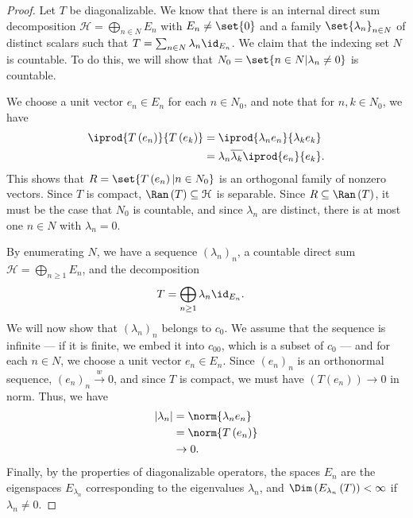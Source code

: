 \documentclass[10pt]{mypackage}
\begin{document}
\begin{proof}
  Let $T$ be diagonalizable. We know that there is an internal direct sum decomposition $\mathcal{H} = \bigoplus_{n\in N}E_n$ with $E_n\neq \set{0}$ and a family $\set{\lambda_n}_{n\in N}$ of distinct scalars such that $T = \sum_{n\in N}\lambda_n\id_{E_n}$. We claim that the indexing set $N$ is countable. To do this, we will show that $N_0 = \set{n\in N | \lambda_n \neq 0}$ is countable.\newline

  We choose a unit vector $e_n\in E_n$ for each $n\in N_0$, and note that for $n,k\in N_0$, we have
  \begin{align*}
    \iprod{T\left(e_n\right)}{T\left(e_k\right)} &= \iprod{\lambda_ne_n}{\lambda_ke_k}\\
                                                 &= \lambda_n \overline{\lambda_k} \iprod{e_n}{e_k}.
  \end{align*}
  This shows that $R = \set{T\left(e_n\right) | n\in N_0}$ is an orthogonal family of nonzero vectors. Since $T$ is compact, $\Ran\left(T\right) \subseteq \mathcal{H}$ is separable. Since $R\subseteq \Ran\left(T\right)$, it must be the case that $N_0$ is countable, and since $\lambda_n$ are distinct, there is at most one $n\in N$ with $\lambda_n = 0$.\newline

  By enumerating $N$, we have a sequence $\left(\lambda_n\right)_n$, a countable direct sum $\mathcal{H} = \bigoplus_{n\geq 1}E_n$, and the decomposition 
  \begin{align*}
    T &= \bigoplus_{n\geq 1}\lambda_n\id_{E_n}.
  \end{align*}
  We will now show that $\left(\lambda_n\right)_n$ belongs to $c_0$. We assume that the sequence is infinite --- if it is finite, we embed it into $c_{00}$, which is a subset of $c_0$ --- and for each $n\in N$, we choose a unit vector $e_n\in E_n$. Since $\left(e_n\right)_n$ is an orthonormal sequence, $\left(e_n\right)_n\xrightarrow{w} 0$, and since $T$ is compact, we must have $\left(T\left(e_n\right)\right)\rightarrow 0$ in norm. Thus, we have
  \begin{align*}
    \left\vert \lambda_n \right\vert &= \norm{\lambda_ne_n}\\
                                     &= \norm{T\left(e_n\right)}\\
                                     &\rightarrow 0.
  \end{align*}
  Finally, by the properties of diagonalizable operators, the spaces $E_n$ are the eigenspaces $E_{\lambda_n}$ corresponding to the eigenvalues $\lambda_n$, and $\Dim\left(E_{\lambda_n}\left(T\right)\right) < \infty$ if $\lambda_n\neq 0$.\newline


\end{proof}
\end{document}
